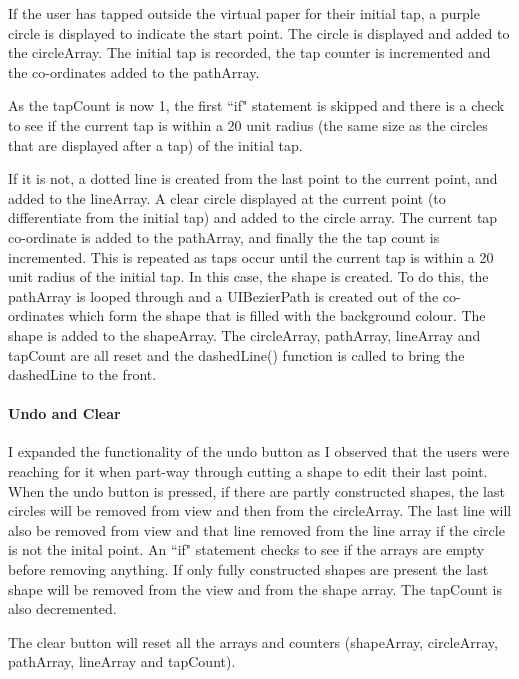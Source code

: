 \documentclass[11pt]{article}
\begin{document}
                 If the user has tapped outside the virtual paper for their initial tap, a purple circle is displayed to indicate the start point. The circle is displayed and added to the circleArray. The initial tap is recorded, the tap counter is incremented and the co-ordinates added to the pathArray. 
                 
                 As the tapCount is now 1, the first ``if" statement is skipped and there is a check to see if the current tap is within a 20 unit radius (the same size as the circles that are displayed after a tap) of the initial tap. 
                 
                 If it is not, a dotted line is created from the last point to the current point, and added to the lineArray. A clear circle displayed at the current point (to differentiate from the initial tap) and added to the circle array. The current tap co-ordinate is added to the pathArray, and finally the the tap count is incremented. This is repeated as taps occur until the current tap is within a 20 unit radius of the initial tap. In this case, the shape is created. To do this, the pathArray is looped through and a UIBezierPath is created out of the co-ordinates which form the shape that is filled with the background colour. The shape is added to the shapeArray. The circleArray, pathArray, lineArray and tapCount are all reset and the dashedLine() function is called to bring the dashedLine to the front. 

            
             \paragraph{Undo and Clear}
              I expanded the functionality of the undo button as I observed that the users were reaching for it when part-way through cutting a shape to edit their last point. 
              When the undo button is pressed, if there are partly constructed shapes, the last circles will be removed from view and then from the circleArray. The last line will also be removed from view and that line removed from the line array if the circle is not the inital point. An ``if" statement checks to see if the arrays are empty before removing anything. If only fully constructed shapes are present the last shape will be removed from the view and from the shape array. The tapCount is also decremented. 
              
              The clear button will reset all the arrays and counters (shapeArray, circleArray, pathArray, lineArray and tapCount).
    
\end{document}
